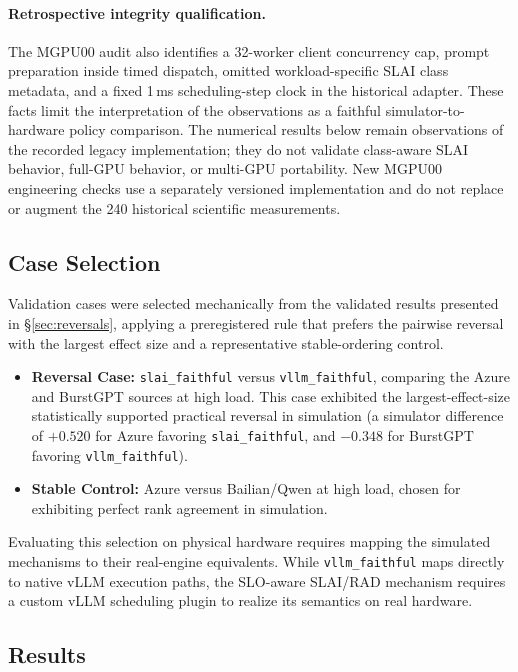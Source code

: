 \paragraph{Retrospective integrity qualification.} The MGPU00 audit also identifies a 32-worker client concurrency cap, prompt preparation inside timed dispatch, omitted workload-specific SLAI class metadata, and a fixed 1\,ms scheduling-step clock in the historical adapter. These facts limit the interpretation of the observations as a faithful simulator-to-hardware policy comparison. The numerical results below remain observations of the recorded legacy implementation; they do not validate class-aware SLAI behavior, full-GPU behavior, or multi-GPU portability. New MGPU00 engineering checks use a separately versioned implementation and do not replace or augment the 240 historical scientific measurements.

\subsection{Case Selection}
\label{sec:real-system-case-selection}

Validation cases were selected mechanically from the validated results presented in \S\ref{sec:reversals}, applying a preregistered rule that prefers the pairwise reversal with the largest effect size and a representative stable-ordering control.

\begin{itemize}
  \item \textbf{Reversal Case:} \texttt{slai\_faithful} versus \texttt{vllm\_faithful}, comparing the Azure and BurstGPT sources at high load. This case exhibited the largest-effect-size statistically supported practical reversal in simulation (a simulator difference of $+0.520$ for Azure favoring \texttt{slai\_faithful}, and $-0.348$ for BurstGPT favoring \texttt{vllm\_faithful}).
  \item \textbf{Stable Control:} Azure versus Bailian/Qwen at high load, chosen for exhibiting perfect rank agreement in simulation.
\end{itemize}

Evaluating this selection on physical hardware requires mapping the simulated mechanisms to their real-engine equivalents. While \texttt{vllm\_faithful} maps directly to native vLLM execution paths, the SLO-aware SLAI/RAD mechanism requires a custom vLLM scheduling plugin to realize its semantics on real hardware.

\subsection{Results}
\label{sec:real-system-result}

